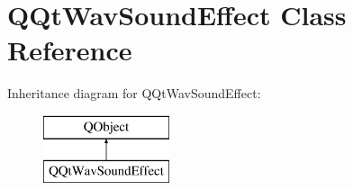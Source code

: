 \hypertarget{class_q_qt_wav_sound_effect}{}\section{Q\+Qt\+Wav\+Sound\+Effect Class Reference}
\label{class_q_qt_wav_sound_effect}
Inheritance diagram for Q\+Qt\+Wav\+Sound\+Effect\+:\begin{figure}[H]
\begin{center}
\leavevmode
\includegraphics[height=2.000000cm]{class_q_qt_wav_sound_effect}
\end{center}
\end{figure}
